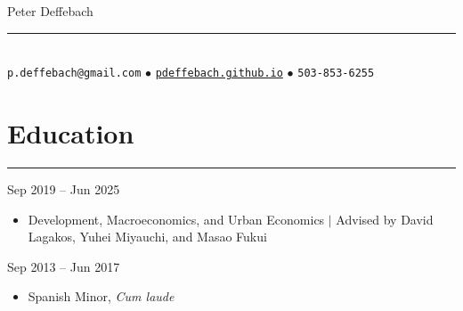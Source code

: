 \documentclass[10pt]{article}
\newenvironment{customitemize}
{ \begin{itemize}[leftmargin=\parindent, topsep = 0.2pt, itemsep = -3pt] }
{\end{itemize} }
\begin{document}
\normalsize
\singlespacing
\thispagestyle{empty}

\begin{center}
{\Large  Peter Deffebach} \\ 
\vspace{-5pt}
\rule{3in}{1pt} \\
\texttt{p.deffebach@gmail.com} $\bullet$ \href{https://pdeffebach.github.io/}{\texttt{pdeffebach.github.io}} $\bullet$ \texttt{503-853-6255}  \\
\end{center} 

\vspace{-12pt}
\section*{Education}
\noindent \rule{\textwidth}{1pt} 
  \hfill Sep 2019 -- Jun 2025
\begin{customitemize}
	\item Development, Macroeconomics, and Urban Economics $\big |$ Advised by David Lagakos, Yuhei Miyauchi, and Masao Fukui
\end{customitemize}
  \hfill Sep 2013 -- Jun 2017
\begin{customitemize}
	\item Spanish Minor, \textit{Cum laude}
\end{customitemize}
\end{document}
